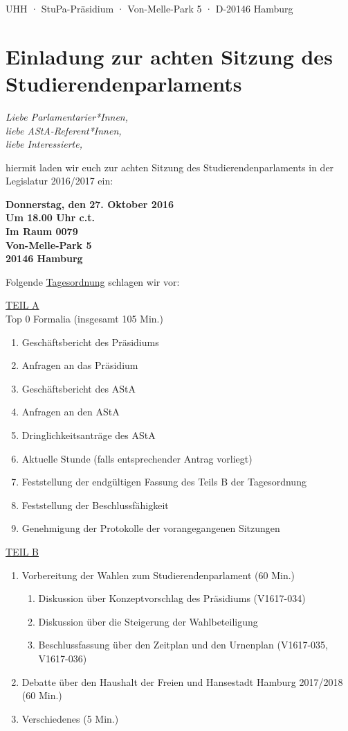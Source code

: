 \documentclass[ngerman,headheight=70pt]{scrartcl}
\begin{document}
    UHH · StuPa-Präsidium · Von-Melle-Park 5 · D-20146 Hamburg

    \section*{Einladung zur achten Sitzung des Studierendenparlaments}

    \textit{Liebe Parlamentarier*Innen,\\
    liebe AStA-Referent*Innen,\\
    liebe Interessierte,}

    hiermit laden wir euch zur achten Sitzung des Studierendenparlaments
    in der Legislatur 2016/2017 ein:

    \textbf{Donnerstag, den 27. Oktober 2016\\
    Um 18.00 Uhr c.t.\\
    Im Raum 0079\\
    Von-Melle-Park 5\\
    20146 Hamburg}

    Folgende \underline{Tagesordnung} schlagen wir vor:

    \underline{TEIL A}\\
    Top 0 Formalia (insgesamt 105 Min.)
    \begin{enumerate}
        \item Geschäftsbericht des Präsidiums
        \item Anfragen an das Präsidium
        \item Geschäftsbericht des AStA
        \item Anfragen an den AStA
        \item Dringlichkeitsanträge des AStA
        \item Aktuelle Stunde (falls entsprechender Antrag vorliegt)
        \item Feststellung der endgültigen Fassung des Teils B der Tagesordnung
        \item Feststellung der Beschlussfähigkeit
        \item Genehmigung der Protokolle der vorangegangenen Sitzungen
    \end{enumerate}
    \underline{TEIL B}\\
    \begin{enumerate}[label={\textbf{Top \theenumi}},leftmargin=*]
        \item Vorbereitung der Wahlen zum Studierendenparlament (60 Min.)
        \begin{enumerate}
            \item Diskussion über Konzeptvorschlag des Präsidiums (V1617-034)
            \item Diskussion über die Steigerung der Wahlbeteiligung
            \item Beschlussfassung über den Zeitplan und den Urnenplan
            (V1617-035, V1617-036)
        \end{enumerate}
        \item Debatte über den Haushalt der Freien und Hansestadt Hamburg
              2017/2018 (60 Min.)
        \item Verschiedenes (5 Min.)
    \end{enumerate}
\end{document}
